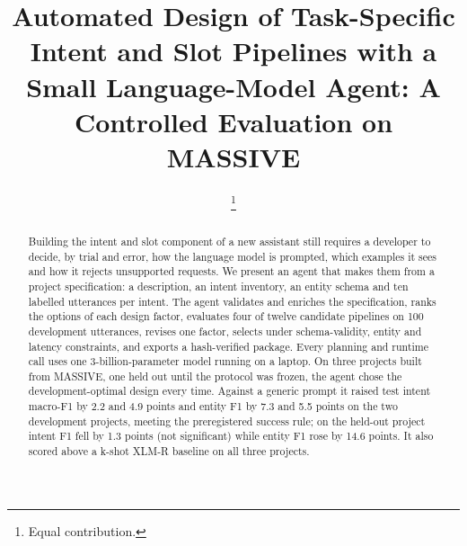 \documentclass[conference]{IEEEtran}
\begin{document}

\title{Automated Design of Task-Specific Intent and Slot Pipelines with a Small Language-Model Agent: A Controlled Evaluation on MASSIVE}

\author{
\and
{}
\and
{}
\thanks{Equal contribution.}
}

\maketitle

\begin{abstract}
Building the intent and slot component of a new assistant still requires a developer to decide, by trial and error, how the language model is prompted, which examples it sees and how it rejects unsupported requests. We present an agent that makes them from a project specification: a description, an intent inventory, an entity schema and ten labelled utterances per intent. The agent validates and enriches the specification, ranks the options of each design factor, evaluates four of twelve candidate pipelines on 100 development utterances, revises one factor, selects under schema-validity, entity and latency constraints, and exports a hash-verified package. Every planning and runtime call uses one 3-billion-parameter model running on a laptop. On three projects built from MASSIVE, one held out until the protocol was frozen, the agent chose the development-optimal design every time. Against a generic prompt it raised test intent macro-F1 by 2.2 and 4.9 points and entity F1 by 7.3 and 5.5 points on the two development projects, meeting the preregistered success rule; on the held-out project intent F1 fell by 1.3 points (not significant) while entity F1 rose by 14.6 points. It also scored above a k-shot XLM-R baseline on all three projects.
\end{abstract}
\end{document}
